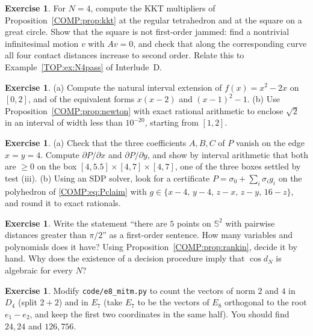 \documentclass[11pt,openany]{book}
\theoremstyle{plain}
\theoremstyle{definition}
\newtheorem{exercise}[theorem]{Exercise}
\theoremstyle{remark}
\newcommand{\Sph}{\mathbb{S}}          %
\begin{document}
\begin{exercise}\label{COMP:exc:kkt}
For $N=4$, compute the KKT multipliers of Proposition~\ref{COMP:prop:kkt} at the regular tetrahedron and at the
square on a great circle. Show that the square is not first-order jammed: find a nontrivial infinitesimal motion $v$ with $Av=0$, and
check that along the corresponding curve all four contact distances increase to second order. Relate this to
Example~\ref{TOP:ex:N4pass} of Interlude~D.
\end{exercise}

\begin{exercise}
(a) Compute the natural interval extension of $f(x)=x^2-2x$ on $[0,2]$, and of the equivalent forms $x(x-2)$ and
$(x-1)^2-1$. (b) Use Proposition~\ref{COMP:prop:newton} with exact rational arithmetic to enclose $\sqrt2$ in an
interval of width less than $10^{-20}$, starting from $[1,2]$.
\end{exercise}

\begin{exercise}\label{COMP:exc:sos}
(a) Check that the three coefficients $A,B,C$ of $P$ vanish on the edge $x=y=4$.
Compute $\partial P/\partial x$ and $\partial P/\partial y$, and show by interval arithmetic that both are
$\ge0$ on the box $[4,5.5]\times[4,7]\times[4,7]$, one of the three boxes settled by test (iii). (b) Using an SDP solver,
look for a certificate $P=\sigma_0+\sum_i\sigma_ig_i$ on the polyhedron of \eqref{COMP:eq:Pclaim} with
$g\in\{x-4,\,y-4,\,z-x,\,z-y,\,16-z\}$, and round it to exact rationals.
\end{exercise}

\begin{exercise}
Write the statement ``there are $5$ points on $\Sph^2$ with pairwise distances greater than $\pi/2$'' as a
first-order sentence. How many variables and polynomials does it have? Using
Proposition~\ref{COMP:prop:rankin}, decide it by hand. Why does the existence of a decision procedure imply that
$\cos d_N$ is algebraic for every $N$?
\end{exercise}

\begin{exercise}
Modify \texttt{code/e8\_mitm.py} to count the vectors of norm $2$ and $4$ in $D_4$ (split $2+2$) and in $E_7$
(take $E_7$ to be the vectors of $E_8$ orthogonal to the root $e_1-e_2$, and keep the first two coordinates in the
same half). You should find $24,24$ and $126,756$.
\end{exercise}

\end{document}

